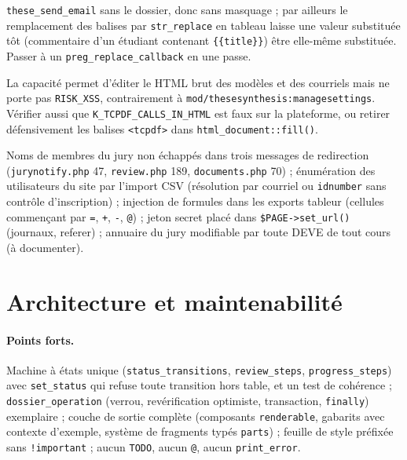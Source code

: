 \documentclass[11pt,a4paper]{article}
\newcommand{\fichier}[1]{\texttt{\small #1}}
\newcommand{\code}[1]{\texttt{#1}}
\begin{document}
\begin{description}[style=nextline]
    \code{these\_send\_email} sans le dossier, donc sans masquage ; par ailleurs le remplacement
    des balises par \code{str\_replace} en tableau laisse une valeur substituée tôt (commentaire
    d'un étudiant contenant \code{\{\{title\}\}}) être elle-même substituée. Passer à un
    \code{preg\_replace\_callback} en une passe.
  \item[Moyen --- risques non déclarés sur \code{mod/these:managedeve}.]
    La capacité permet d'éditer le HTML brut des modèles et des courriels mais ne porte pas
    \code{RISK\_XSS}, contrairement à \code{mod/thesesynthesis:managesettings}. Vérifier aussi
    que \code{K\_TCPDF\_CALLS\_IN\_HTML} est faux sur la plateforme, ou retirer défensivement les
    balises \code{<tcpdf>} dans \code{html\_document::fill()}.
  \item[Faible.] Noms de membres du jury non échappés dans trois messages de redirection
    (\fichier{jurynotify.php} 47, \fichier{review.php} 189, \fichier{documents.php} 70) ;
    énumération des utilisateurs du site par l'import CSV (résolution par courriel ou
    \code{idnumber} sans contrôle d'inscription) ; injection de formules dans les exports
    tableur (cellules commençant par \code{=}, \code{+}, \code{-}, \code{@}) ; jeton secret
    placé dans \code{\$PAGE->set\_url()} (journaux, referer) ; annuaire du jury modifiable par
    toute DEVE de tout cours (à documenter).
\end{description}

\section{Architecture et maintenabilité}\label{sec:architecture}

\paragraph{Points forts.}
Machine à états unique (\code{status\_transitions}, \code{review\_steps},
\code{progress\_steps}) avec \code{set\_status} qui refuse toute transition hors table, et un test
de cohérence ; \code{dossier\_operation} (verrou, revérification optimiste, transaction,
\code{finally}) exemplaire ; couche de sortie complète (composants \code{renderable},
gabarits avec contexte d'exemple, système de fragments typés \code{parts}) ; feuille de style
préfixée sans \code{!important} ; aucun \code{TODO}, aucun \code{@}, aucun \code{print\_error}.
\end{document}

